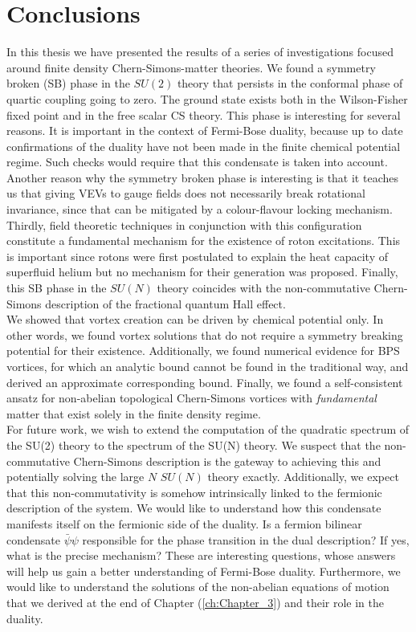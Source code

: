 
\chapter*{Conclusions}

    In this thesis we have presented the results of a series of investigations focused around finite density Chern-Simons-matter theories. We found a symmetry broken (SB) phase in the $SU(2)$ theory that persists in the conformal phase of quartic coupling going to zero. The ground state exists both in the Wilson-Fisher fixed point and in the free scalar CS theory. This phase is interesting for several reasons. It is important in the context of Fermi-Bose duality,  because up to date confirmations of the duality have not been made in the finite chemical potential regime. Such checks would require that this condensate is taken into account. Another reason why the symmetry broken phase is interesting is that it teaches us that giving VEVs to gauge fields does not necessarily break rotational invariance, since that can be mitigated by a colour-flavour locking mechanism. Thirdly, field theoretic techniques in conjunction with this configuration constitute a fundamental mechanism for the existence of roton excitations. This is important since  rotons were first postulated to explain the heat capacity of superfluid helium \cite{PhysRev.60.356} but no mechanism for their generation was proposed. Finally, this SB phase in the $SU(N)$ theory coincides with the non-commutative Chern-Simons description of the fractional quantum Hall effect.\\
    \indent We showed that vortex creation can be driven by chemical potential only. In other words, we found vortex solutions that do not require a symmetry breaking potential for their existence. Additionally, we found numerical evidence for BPS vortices, for which an analytic bound cannot be found in the traditional way, and derived an approximate corresponding bound. Finally, we found a self-consistent ansatz for non-abelian topological Chern-Simons vortices with \textit{fundamental} matter that exist solely in the finite density regime.\\
    \indent For future work, we wish to extend the computation of the quadratic spectrum of the SU(2) theory to the spectrum of the SU(N) theory. We suspect that the non-commutative Chern-Simons description is the gateway to achieving this and potentially solving the large $N$ $SU(N)$ theory exactly. Additionally, we expect that this non-commutativity is somehow intrinsically linked to the fermionic description of the system. We would like to understand how this condensate manifests itself on the fermionic side of the duality. Is a fermion bilinear condensate $\bar{\psi} \psi$ responsible for the phase transition in the dual description? If yes, what is the precise mechanism? These are interesting questions, whose answers will help us gain a better understanding of Fermi-Bose duality. Furthermore, we would like to understand the solutions of the non-abelian equations of motion that we derived at the end of Chapter (\ref{ch:Chapter_3}) and their role in the duality.\\
